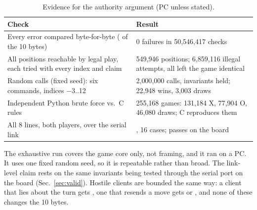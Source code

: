 \begin{table}[t]
\centering
\caption{Evidence for the authority argument (PC unless stated).}
\label{tab:logic}
\scriptsize
\begin{tabular}{@{}L{3.9cm}L{3.9cm}@{}}
\toprule
Check & Result \\
\midrule
Every error compared byte-for-byte ( of the 10 bytes) & 0 failures in 50{,}546{,}417 checks \\
All positions reachable by legal play, each tried with every index and claim & 549{,}946 positions; 6{,}859{,}116 illegal attempts, all left the game identical \\
Random calls (fixed seed): six commands, indices $-3$..12 & 2{,}000{,}000 calls, invariants held; 22{,}948 wins, 3{,}003 draws \\
Independent Python brute force vs.\ C rules & 255{,}168 games: 131{,}184 X, 77{,}904 O, 46{,}080 draws; C reproduces them \\
All 8 lines, both players, over the serial link & , 16 cases; passes on the board \\
\bottomrule
\end{tabular}
\end{table}

The exhaustive run covers the game core only, not framing, and it ran on a PC. It uses one fixed random seed, so it is repeatable
rather than broad. The link-level claim rests on the same invariants being tested through the serial port on the board
(Sec.~\ref{sec:valid}). Hostile clients are bounded the same way: a client that lies about the turn gets , one that
resends a move gets  or , and none of these changes the 10 bytes.
